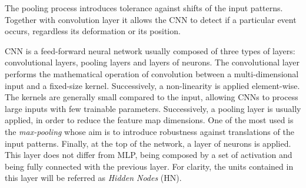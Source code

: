 \begin{enumerate}
	
	The pooling process introduces tolerance against shifts of the input patterns. Together with convolution layer it allows the CNN to detect if a particular event occurs, regardless its deformation or its position.
	
	CNN is a feed-forward neural network \cite{lecun1998gradient} usually composed of three types of layers: convolutional layers, pooling layers and layers of neurons.
	The convolutional layer performs the mathematical operation of convolution between a multi-dimensional input and a fixed-size kernel. Successively, a non-linearity is applied element-wise. 
	The kernels are generally small compared to the input, allowing CNNs to process large inputs with few trainable parameters.
	Successively, a pooling layer is usually applied, in order to reduce the feature map dimensions. One of the most used is the \textit{max-pooling} whose aim is to introduce robustness against translations of the input patterns.
	Finally, at the top of the network, a layer of neurons is applied. This layer does not differ from MLP, being composed by a set of activation and being fully connected with the previous layer. For clarity, the units contained in this layer will be referred as \textit{Hidden Nodes} (HN).
	

\end{enumerate}
